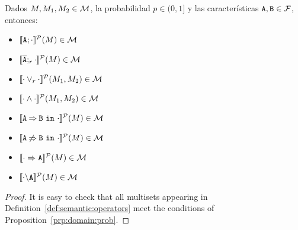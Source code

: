 




\bprop\label{prp:domain:prob}
  Dados  $M,M_{1}, M_{2}\in{\cal M}$,
  la probabilidad $p\in(0,1]$ y
  las características $\mathtt{A},\mathtt{B}\in{\cal F}$, entonces:
  \begin{itemize}
  \item $[\![\mathtt{A};\cdot]\!]^{\cal P}(M)\in{\cal M}$
  \item $[\![\overline{\mathtt{A}};_{r}\cdot]\!]^{\cal P}(M)\in{\cal M}$
  \item $[\![\cdot\mathbin{\lor}_{r}\cdot]\!]^{\cal P}(M_{1},M_{2})\in{\cal M}$
  \item $[\![\cdot\mathbin{\wedge}\cdot]\!]^{\cal P}(M_{1},M_{2})\in{\cal M}$
  \item $[\![\mathtt{A}\mathbin{\Rightarrow}\mathtt{B}\ \mathtt{in}\ \cdot]\!]^{\cal P}(M)\in{\cal M}$
  \item $[\![\mathtt{A}\mathbin{\not\Rightarrow}\mathtt{B}\ \mathtt{in}\ \cdot]\!]^{\cal P}(M)\in{\cal M}$
  \item $[\![\cdot\Rightarrow\mathtt{A}]\!]^{\cal P}(M)\in{\cal M}$
  \item $[\![\cdot\backslash\mathtt{A}]\!]^{\cal P}(M)\in{\cal M}$
  \end{itemize}


  \begin{proof}
    It is easy to check that all multisets appearing in
    Definition~\ref{def:semantic:operators}
    meet the conditions of Proposition~\ref{prp:domain:prob}.
  \end{proof}
\eprop





